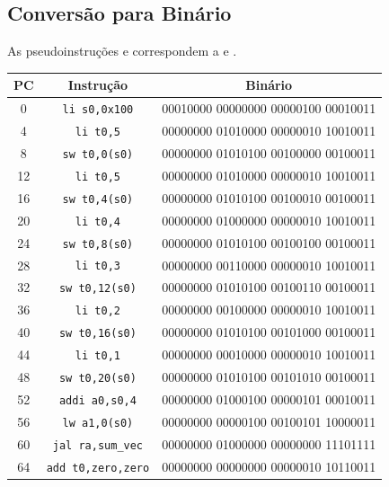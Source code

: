 \documentclass[12pt,a4paper,titlepage]{article}
\begin{document}
\clearpage\subsection{Conversão para Binário}
As pseudoinstruções  e  correspondem a  e .
\begin{table}[h]
    \centering
    \begin{tabular}{|c|c|c|}
        \hline
        \textbf{PC} & \textbf{Instrução} & \textbf{Binário} \\ \hline\hline
        0 & \texttt{li s0,0x100} & 00010000 00000000 00000100 00010011 \\ \hline
        4 & \texttt{li t0,5} & 00000000 01010000 00000010 10010011 \\ \hline
        8 & \texttt{sw t0,0(s0)} & 00000000 01010100 00100000 00100011 \\ \hline
        12 & \texttt{li t0,5} & 00000000 01010000 00000010 10010011 \\ \hline
        16 & \texttt{sw t0,4(s0)} & 00000000 01010100 00100010 00100011 \\ \hline
        20 & \texttt{li t0,4} & 00000000 01000000 00000010 10010011 \\ \hline
        24 & \texttt{sw t0,8(s0)} & 00000000 01010100 00100100 00100011 \\ \hline
        28 & \texttt{li t0,3} & 00000000 00110000 00000010 10010011 \\ \hline
        32 & \texttt{sw t0,12(s0)} & 00000000 01010100 00100110 00100011 \\ \hline
        36 & \texttt{li t0,2} & 00000000 00100000 00000010 10010011 \\ \hline
        40 & \texttt{sw t0,16(s0)} & 00000000 01010100 00101000 00100011 \\ \hline
        44 & \texttt{li t0,1} & 00000000 00010000 00000010 10010011 \\ \hline
        48 & \texttt{sw t0,20(s0)} & 00000000 01010100 00101010 00100011 \\ \hline
        52 & \texttt{addi a0,s0,4} & 00000000 01000100 00000101 00010011 \\ \hline
        56 & \texttt{lw a1,0(s0)} & 00000000 00000100 00100101 10000011 \\ \hline
        60 & \texttt{jal ra,sum\_vec} & 00000000 01000000 00000000 11101111 \\ \hline
        64 & \texttt{add t0,zero,zero} & 00000000 00000000 00000010 10110011 \\ \hline

\end{tabular}
\end{table}
\end{document}
